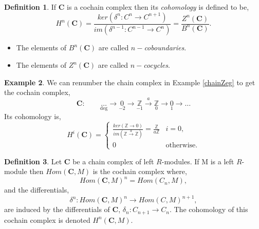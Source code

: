 \documentclass[11.5pt, twoside, a4paper, titlepage]{report}
\theoremstyle{definition}
\newtheorem{mydef}{Definition}[section]
\newtheorem{eg}[mydef]{Example}
\theoremstyle{plain}
\begin{document}
\begin{mydef}
If $\mathbf{C}$ is a cochain complex then its \emph{cohomology} is defined to be,
\begin{equation*}
H^n(\mathbf{C})=\frac{ker(\delta^n:C^n \rightarrow C^{n+1})}{im(\delta^{n-1}:C^{n-1} \rightarrow C^n)} =\frac{Z^n(\mathbf{C})}{B^n(\mathbf{C})}.
\end{equation*}
\begin{itemize}
\item The elements of $B^n(\mathbf{C})$ are called \emph{$n-$coboundaries}.
\item The elements of $Z^n(\mathbf{C})$ are called \emph{$n-$cocycles}.
\end{itemize}
\end{mydef}

\begin{eg}
We can renumber the chain complex in Example \ref{chainZeg} to get the cochain complex, 
\begin{equation*}
\mathbf{C}: \qquad \underset{\text{deg}}{\dots} \xrightarrow{}\underset{-2}{0} \xrightarrow{} \underset{-1}{\mathbb{Z}} \xrightarrow{a}\underset{0}{\mathbb{Z}} \xrightarrow{} \underset{1}{0} \xrightarrow{}\dots 
\end{equation*}
Its cohomology is,
\begin{equation*}
H^i(\mathbf{C}) = 
\begin{cases}
\frac{ker(\mathbb{Z}\xrightarrow{} 0)}{im(\mathbb{Z}\xrightarrow{a}\mathbb{Z})}=\frac{\mathbb{Z}}{a\mathbb{Z}} & i=0,\\
0 & \text{otherwise}.
\end{cases}
\end{equation*}
\end{eg}

\begin{mydef}
Let $\mathbf{C}$ be a chain complex of left $R$-modules. If M is a left $R$-module then \emph{$Hom(\mathbf{C}, M)$} is the cochain complex where,
\begin{equation*}
Hom(\mathbf{C}, M)^n=Hom(C_n, M),
\end{equation*}
and the differentials, 
\begin{equation*}
\delta^n: Hom(\mathbf{C}, M)^n \to Hom(C, M)^{n+1},
\end{equation*}
are induced by the differentials of $\mathbf{C}$, $\delta_n:C_{n+1}\to C_n$. The cohomology of this cochain complex is denoted $H^n(\mathbf{C}, M)$.
\end{mydef}
\end{document}
